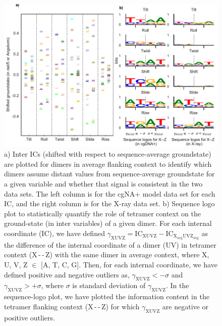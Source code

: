 \begin{figure}
	\begin{center}
	\includegraphics[scale=1]{./Xray_images/X2_logo_inter_mono-flank_bits.pdf}
	\caption{
a) Inter ICs (shifted with respect to sequence-average groundstate) are plotted for dimers in average flanking context to identify which dimers assume distant values from sequence-average groundstate for a given variable and whether that signal is consistent in the two data sets. The left column is for the cgNA$+$ model data set for each IC, and the right column is for the X-ray data set. b)
Sequence logo plot to statistically quantify
the role of tetramer context on the ground-state (in inter variables) of a given dimer.
For each internal coordinate (IC), we have defined $\gamma_{\text{XUVZ}}= \text{IC}_{\text{XUVZ}} - \text{IC}_{\text{X}_{\text{avg}}\text{UV}\text{Z}_{\text{avg}}}$ as the difference of the internal coordinate of a dimer (UV) in tetramer context (X\,-\,-\,Z) with the same dimer in average context, where X, U, V, Z $\in$ [A, T, C, G]. 
Then, for each internal coordinate, we have defined positive and negative outliers as, $ \gamma_{\text{XUVZ}} < -\sigma$
and $ \gamma_{\text{XUVZ}} > +\sigma$, 
where $\sigma$ is standard deviation of $\gamma_{\text{XUVZ}}$.
In the sequence-logo plot, we have plotted the information content in the tetramer flanking context (X\,-\,-\,Z) for which $\gamma_{\text{XUVZ}}$ are negative or positive outliers.
}
\label{SIfig:logo_bits}
\end{center}
\end{figure}


